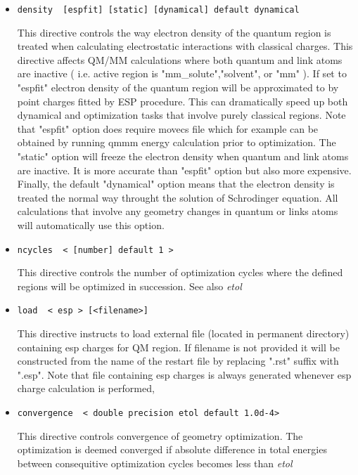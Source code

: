 \begin{itemize}
\item
\begin{verbatim}
density  [espfit] [static] [dynamical] default dynamical
\end{verbatim}

This directive controls the way electron density of the quantum region is treated when calculating
electrostatic interactions with classical charges. This directive affects QM/MM calculations where both
quantum and link atoms are inactive ( i.e. active region is "mm{\_}solute","solvent", or "mm" ).
If set to "espfit" electron density of the quantum region will be approximated to by point charges
fitted by ESP procedure. This can dramatically speed up both dynamical and optimization tasks that involve purely classical regions.
Note that "espfit" option does require movecs file which for example
can be obtained by running qmmm energy calculation prior to optimization. 
The "static" option will freeze the electron density when quantum and link atoms are inactive. It is more accurate than
"espfit" option but also more expensive. Finally, the default "dynamical" option means that the electron density
is treated the normal way throught the solution of Schrodinger equation. All calculations that involve any geometry
changes in quantum or links atoms will automatically use this option.

\item
\begin{verbatim}
ncycles  < [number] default 1 >
\end{verbatim}

This directive controls the number of optimization cycles where the defined regions will be optimized in succession.
See also {\it etol}

\item
\begin{verbatim}
load  < esp > [<filename>]
\end{verbatim}

This directive instructs to load external file (located in permanent directory) containing esp charges for QM region.
If filename is not provided it will be constructed from the name of the restart file by replacing ".rst" 
suffix with ".esp".
Note that file containing esp charges is always generated whenever esp charge calculation is performed,

\item
\begin{verbatim}
convergence  < double precision etol default 1.0d-4> 
\end{verbatim}

This directive controls convergence of geometry optimization. The optimization is deemed converged if absolute difference in 
total energies between consequitive optimization cycles becomes less than 
{\it etol} 



\end{itemize}



